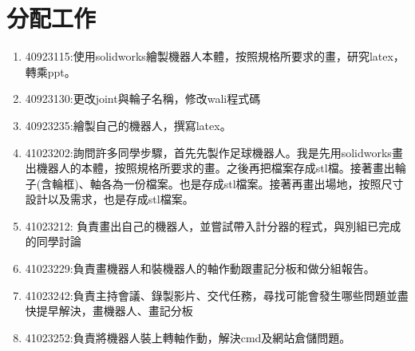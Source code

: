 \chapter{分配工作}
\begin{enumerate}
\item 40923115:使用solidworks繪製機器人本體，按照規格所要求的畫，研究latex，轉乘ppt。
\item 40923130:更改joint與輪子名稱，修改wali程式碼 
\item 40923235:繪製自己的機器人，撰寫latex。
\item 41023202:詢問許多同學步驟，首先先製作足球機器人。我是先用solidworks畫出機器人的本體，按照規格所要求的畫。之後再把檔案存成stl檔。接著畫出輪子(含輪框)、軸各為一份檔案。也是存成stl檔案。接著再畫出場地，按照尺寸設計以及需求，也是存成stl檔案。 
\item 41023212: 負責畫出自己的機器人，並嘗試帶入計分器的程式，與別組已完成的同學討論 
\item 41023229:負責畫機器人和裝機器人的軸作動跟畫記分板和做分組報告。 
\item 41023242:負責主持會議、錄製影片、交代任務，尋找可能會發生哪些問題並盡快提早解決，畫機器人、畫記分板 
\item 41023252:負責將機器人裝上轉軸作動，解決cmd及網站倉儲問題。 
\end{enumerate}
\newpage
